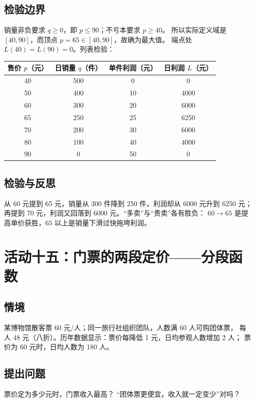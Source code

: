 \subsection{检验边界}
销量非负要求 $q\ge0$，即 $p\le90$；不亏本要求 $p\ge40$。
所以实际定义域是 $[40,90]$，而顶点 $p=65\in[40,90]$，故确为最大值。
端点处 $L(40)=L(90)=0$。列表检验：
\begin{center}
\footnotesize
\setlength{\tabcolsep}{8pt}
\renewcommand{\arraystretch}{1.3}
\begin{tabular}{cccc}
\toprule
售价 $p$（元） & 日销量 $q$（件） & 单件利润（元） & 日利润 $L$（元） \\
\midrule
40 & 500 & 0 & 0 \\
50 & 400 & 10 & 4000 \\
60 & 300 & 20 & 6000 \\
65 & 250 & 25 & 6250 \\
70 & 200 & 30 & 6000 \\
80 & 100 & 40 & 4000 \\
90 & 0 & 50 & 0 \\
\bottomrule
\end{tabular}
\end{center}

\subsection{检验与反思}
从 60 元提到 65 元，销量从 300 件降到 250 件，利润却从 6000 元升到 6250 元；
再提到 70 元，利润又回落到 6000 元。“多卖”与“贵卖”各有胜负：
$60\to65$ 是提高单价获胜，$65$ 以上是销量下滑过快拖垮利润。

\section{活动十五：门票的两段定价——分段函数}

\subsection{情境}
某博物馆散客票 60 元/人；同一旅行社组织团队，人数满 60 人可购团体票，
每人 48 元（八折）。历年数据显示：票价每降低 1 元，日均参观人数增加 2 人；
票价为 60 元时，日均人数为 180 人。

\subsection{提出问题}
票价定为多少元时，门票收入最高？
“团体票更便宜，收入就一定变少”对吗？


